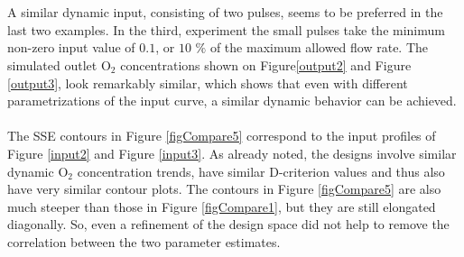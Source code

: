 \\
\\
A similar dynamic input, consisting of two pulses, seems to be preferred in the last two examples. In the third, experiment the small pulses take the minimum non-zero input value of $0.1$, or $10$ $\%$ of the maximum allowed flow rate. The simulated outlet $\text{O}_2$ concentrations shown on Figure\ref{output2} and Figure \ref{output3}, look remarkably similar, which shows that even with different parametrizations of the input curve, a similar dynamic behavior can be achieved.
\\
\\
The SSE contours in Figure \ref{figCompare5} correspond to the input profiles of Figure \ref{input2} and Figure \ref{input3}. As already noted, the designs involve similar dynamic $\text{O}_2$ concentration trends, have similar D-criterion values and thus also have very similar contour plots. The contours in Figure \ref{figCompare5} are also much steeper than those in Figure \ref{figCompare1}, but they are still elongated diagonally. So, even a refinement of the design space did not help to remove the correlation between the two parameter estimates.
